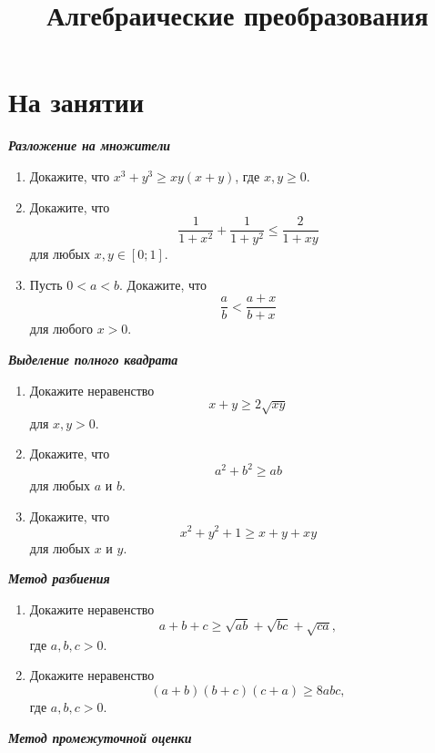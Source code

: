 \documentclass[a4paper,12pt,leqno]{article}
\title{\textbf{Алгебраические преобразования}}
\date{}
\begin{document}
	\parskip=0mm
	\linespread{1}
	\maketitle
	
	
	\newcommand{\z}{\addtocounter{zadacha}{1}%
		\boxed{\arabic{zadacha}} }
	\section*{На занятии}
	\textbf{\textit{Разложение на множители}}
	\begin{enumerate}
		\item[\z] Докажите, что $x^3 + y^3 \geqslant xy(x+y)$, где $x, y \geq 0$.
		
		\item[\z] Докажите, что $$\frac{1}{1+x^2} + \frac{1}{1+y^2} \leqslant \frac{2}{1+xy}$$ для любых $x, y \in [0; 1]$.
		
		\item[\z] Пусть $0 < a < b$. Докажите, что $$\frac{a}{b} < \frac{a+x}{b+x}$$ для любого $x > 0$.
		
	\end{enumerate}
	
	\textbf{\textit{Выделение полного квадрата}}
	
	\begin{enumerate}
		\item[\z] Докажите неравенство $$x + y \geqslant 2\sqrt{xy}$$ для $x, y > 0$.
		
		\item[\z] Докажите, что $$a^2+b^2 \geqslant ab$$ для любых $a$ и $b$.
		
		\item[\z] Докажите, что $$x^2+y^2+1 \geqslant x + y + xy$$ для любых $x$ и $y$.
	\end{enumerate}
	
	\textbf{\textit{Метод разбиения}}
	
	\begin{enumerate}
		\item[\z] Докажите неравенство $$a+b+c \geqslant \sqrt{ab} + \sqrt{bc} + \sqrt{ca} ,$$
		где $a, b, c > 0$. 
		\newpage
		\item[\z] Докажите неравенство $$(a+b)(b+c)(c+a) \geqslant 8abc ,$$
		где $a, b, c > 0$.
	\end{enumerate}
	
	\textbf{\textit{Метод промежуточной оценки}}
	
\end{document}
